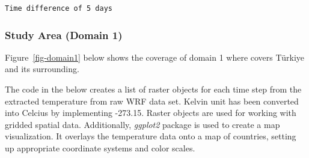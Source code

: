 \documentclass[
  letterpaper,
  DIV=11,
  numbers=noendperiod,
  abstract]{scrartcl}
\begin{document}
\begin{verbatim}
Time difference of 5 days
\end{verbatim}

\hypertarget{study-area-domain-1}{%
\subsubsection{Study Area (Domain 1)}\label{study-area-domain-1}}

Figure~\ref{fig-domain1} below shows the coverage of domain 1 where
covers Türkiye and its surrounding.

The code in the below creates a list of raster objects for each time
step from the extracted temperature from raw WRF data set. Kelvin unit
has been converted into Celcius by implementing -273.15. Raster objects
are used for working with gridded spatial data. Additionally,
\emph{ggplot2} package is used to create a map visualization. It
overlays the temperature data onto a map of countries, setting up
appropriate coordinate systems and color scales.
\end{document}
